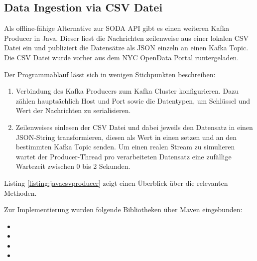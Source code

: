 \subsection{Data Ingestion via CSV Datei}
Als offline-fähige Alternative zur \ac{SODA} API gibt es einen weiteren Kafka Producer in Java. Dieser liest die Nachrichten zeilenweise aus einer lokalen \ac{CSV} Datei ein und publiziert die Datensätze als \ac{JSON} einzeln an einen Kafka Topic. Die \ac{CSV} Datei wurde vorher aus dem NYC OpenData Portal runtergeladen.

Der Programmablauf lässt sich in wenigen Stichpunkten beschreiben:
\begin{enumerate}
	\item Verbindung des Kafka Producers zum Kafka Cluster konfigurieren. Dazu zählen hauptsächlich Host und Port sowie die Datentypen, um Schlüssel und Wert der Nachrichten zu serialisieren.  
	\item Zeilenweises einlesen der \ac{CSV} Datei und dabei jeweils den Datensatz in einen \ac{JSON}-String transformieren, diesen  als Wert in einen  setzen und an den bestimmten Kafka Topic senden. Um einen realen Stream zu simulieren wartet der Producer-Thread pro verarbeiteten Datensatz eine zufällige Wartezeit zwischen 0 bis 2 Sekunden.
\end{enumerate}

Listing \ref{listing:javacsvproducer} zeigt einen Überblick über die relevanten Methoden.




Zur Implementierung wurden folgende Bibliotheken über Maven eingebunden:
\begin{itemize}
	\item {}
	\item {}
	\item {}
	\item {}
\end{itemize}

